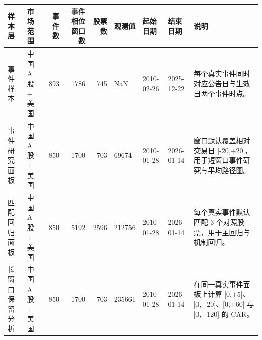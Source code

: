 \begin{tabular}{llrrrllll}
\toprule
样本层 & 市场范围 & 事件数 & 事件相位窗口数 & 股票数 & 观测值 & 起始日期 & 结束日期 & 说明 \\
\midrule
事件样本 & 中国 A 股 + 美国 & 893 & 1786 & 745 & NaN & 2010-02-26 & 2025-12-22 & 每个真实事件同时对应公告日与生效日两个事件时点。 \\
事件研究面板 & 中国 A 股 + 美国 & 850 & 1700 & 703 & 69674 & 2010-01-28 & 2026-01-14 & 窗口默认覆盖相对交易日 [-20,+20]，用于短窗口事件研究与平均路径图。 \\
匹配回归面板 & 中国 A 股 + 美国 & 850 & 5192 & 2596 & 212756 & 2010-01-28 & 2026-01-14 & 每个真实事件默认匹配 3 个对照股票，用于主回归与机制回归。 \\
长窗口保留分析 & 中国 A 股 + 美国 & 850 & 1700 & 703 & 235661 & 2010-01-28 & 2026-01-14 & 在同一真实事件面板上计算 [0,+5]、[0,+20]、[0,+60] 与 [0,+120] 的 CAR。 \\
\bottomrule
\end{tabular}
